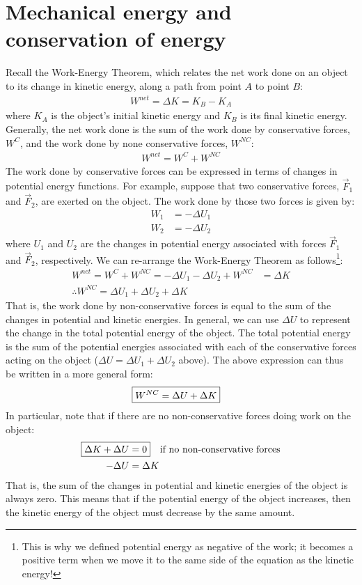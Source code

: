 \section{Mechanical energy and conservation of energy}
Recall the Work-Energy Theorem, which relates the net work done on an object to its change in kinetic energy, along a path from point $A$ to point $B$:
\begin{align*}
W^{net}=\Delta K = K_B - K_A
\end{align*}
where $K_A$ is the object's initial kinetic energy and $K_B$ is its final kinetic energy. Generally, the net work done is the sum of the work done by conservative forces, $W^C$, and the work done by none conservative forces, $W^{NC}$:
\begin{align*}
W^{net}=W^C+W^{NC}
\end{align*}
The work done by conservative forces can be expressed in terms of changes in potential energy functions. For example, suppose that two conservative forces, $\vec F_1$ and $\vec F_2$, are exerted on the object. The work done by those two forces is given by:
\begin{align*}
W_1 &= -\Delta U_1\\
W_2 &= -\Delta U_2
\end{align*}
where $U_1$ and $U_2$ are the changes in potential energy associated with forces $\vec F_1$ and $\vec F_2$, respectively. We can re-arrange the Work-Energy Theorem as follows\footnote{This is why we defined potential energy as negative of the work; it becomes a positive term when we move it to the same side of the equation as the kinetic energy!}:
\begin{align*}
W^{net}=W^C+W^{NC}=-\Delta U_1 - \Delta U_2 +W^{NC} &= \Delta K\\
\therefore W^{NC} = \Delta U_1 + \Delta U_2 + \Delta K
\end{align*}
That is, the work done by non-conservative forces is equal to the sum of the changes in potential and kinetic energies. In general, we can use $\Delta U$ to represent the change in the total potential energy of the object. The total potential energy is the sum of the potential energies associated with each of the conservative forces acting on the object ($\Delta U = \Delta U_1 + \Delta U_2$ above). The above expression can thus be written in a more general form:
\begin{align}
\Aboxed{W^{NC}=\Delta U + \Delta K}
\end{align}
In particular, note that if there are no non-conservative forces doing work on the object:
\begin{align}
\Aboxed{\Delta K + \Delta U &= 0}\quad\text{if no non-conservative forces}\\
-\Delta U &= \Delta K \nonumber
\end{align}
That is, the sum of the changes in potential and kinetic energies of the object is always zero. This means that if the potential energy of the object increases, then the kinetic energy of the object must decrease by the same amount.

